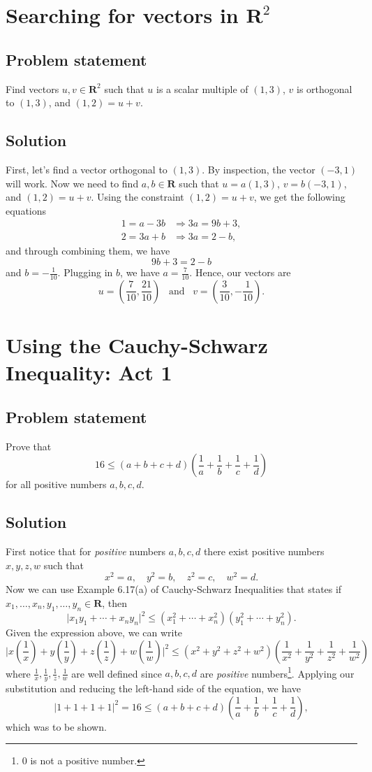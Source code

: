 \documentclass{article}
\providecommand{\abs}[1]{\lvert#1\rvert} \providecommand{\norm}[1]{\lVert#1\rVert}
\begin{document}
\clearpage

\section{Searching for vectors in $\mathbf{R}^2$}
\subsection*{Problem statement}
Find vectors $u,v\in \mathbf{R}^2$ such that $u$ is a scalar multiple of $(1,3)$, $v$ is orthogonal to $(1,3)$, and $(1,2)=u+v$.

\subsection*{Solution}
First, let's find a vector orthogonal to $(1,3)$. 
By inspection, the vector $(-3,1)$ will work. 
Now we need to find $a,b\in\mathbf{R}$ such that $u=a(1,3)$, $v=b(-3,1)$, and $(1,2)=u+v$. 
Using the constraint $(1,2)=u+v$, we get the following equations
\begin{align*} 
1=a-3b &\Rightarrow 3a=9b+3, \\ 
2=3a+b &\Rightarrow 3a=2-b,
\end{align*}
and through combining them, we have
\[9b+3=2-b\]
and $b=-\frac{1}{10}$. 
Plugging in $b$, we have $a=\frac{7}{10}$. 
Hence, our vectors are
\[u=(\frac{7}{10},\frac{21}{10}) \;\;\;\text{and}\;\;\; v=(\frac{3}{10},-\frac{1}{10}).\]

\clearpage

\section{Using the Cauchy-Schwarz Inequality: Act 1}
\subsection*{Problem statement}
Prove that
\[16\leq (a+b+c+d)(\frac{1}{a}+\frac{1}{b}+\frac{1}{c}+\frac{1}{d})\]
for all positive numbers $a,b,c,d$.

\subsection*{Solution}
First notice that for \textit{positive} numbers $a,b,c,d$ there exist positive numbers $x,y,z,w$ such that
\[x^2=a,\quad y^2=b,\quad z^2=c,\quad w^2=d.\]
Now we can use Example 6.17(a) of Cauchy-Schwarz Inequalities that states if $x_1,\ldots,x_n,y_1,\ldots,y_n\in\mathbf{R}$, then
\[\abs{x_1y_1+\cdots+x_ny_n}^2\leq (x_1^2+\cdots+x_n^2)(y_1^2+\cdots+y_n^2).\]
Given the expression above, we can write
\[\abs{x(\frac{1}{x})+y(\frac{1}{y})+z(\frac{1}{z})+w(\frac{1}{w})}^2\leq (x^2+y^2+z^2+w^2)(\frac{1}{x^2}+\frac{1}{y^2}+\frac{1}{z^2}+\frac{1}{w^2})\]
where $\frac{1}{x},\frac{1}{y},\frac{1}{z},\frac{1}{w}$ are well defined since $a,b,c,d$ are \textit{positive} numbers\footnote{0 is not a positive number.}. Applying our substitution and reducing the left-hand side of the equation, we have
\[\abs{1+1+1+1}^2=16\leq (a+b+c+d)(\frac{1}{a}+\frac{1}{b}+\frac{1}{c}+\frac{1}{d}),\]
which was to be shown.
\end{document}
